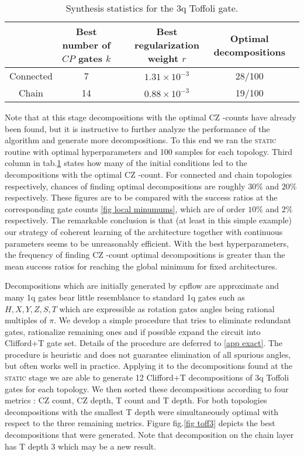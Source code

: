\documentclass[draft, amsfonts, amssymb, aps, nofootinbib, twocolumn]{revtex4-2}
\newcommand{\CZ}{CZ }
\newcommand{\CP}{CP }
\newcommand{\T}{T }
\newcommand{\cpflow}{\textrm {cpflow }}
\newcommand{\static}{\textsc{static }}
\begin{document}
\begin{table}[]
	\begin{tabular}{@{}cccccc@{}}
		\toprule
		& \shortstack[l]{Best number of\\ $\CP$ gates $k$} && \shortstack[l]{Best regularization\\ weight $r$} &  \shortstack[l]{Optimal \\ decompositions} &  \\ \midrule
		Connected & 7      && $1.31\times10^{-3}$ & 28/100                 &  \\
		Chain     & 14     && $0.88\times10^{-3}$ & 19/100                  &  \\ \bottomrule
	\end{tabular}
\caption {Synthesis statistics for the 3q Toffoli gate.}
\label{tab toff3}
\end{table}

Note that at this stage decompositions with the optimal \CZ-counts have already been found, but it is instructive to further analyze the performance of the algorithm and generate more decompositions. To this end we ran the \static routine with optimal hyperparameters and 100 samples for each topology. Third column in tab.\ref{tab toff3} states how many of the initial conditions led to the decompositions with the optimal \CZ-count. For connected and chain topologies respectively, chances of finding optimal decompositions are roughly $30\%$ and $20\%$ respectively. These figures are to be compared with the success ratios at the corresponding gate counts \ref{fig local minumums}, which are of order $10\%$ and $2\%$ respectively. The remarkable conclusion is that (at least in this simple example) our strategy of coherent learning of the architecture together with continuous parameters seems to be unreasonably efficient. With the best hyperparameters, the frequency of finding \CZ-count optimal decompositions is greater than the mean success ratios for reaching the global minimum for fixed architectures.

Decompositions which are initially generated by \cpflow are approximate and many 1q gates bear little resemblance to standard 1q gates such as $H, X, Y, Z, S, T$  which are expressible as rotation gates angles being rational multiples of $\pi$. We develop a simple procedure that tries to eliminate redundant gates, rationalize remaining ones and if possible expand the circuit into Clifford+T gate set. Details of the procedure are deferred to \ref{app exact}. The procedure is heuristic and does not guarantee elimination of all spurious angles, but often works well in practice. Applying it to the decompositions found at the \static stage we are able to generate 12 Clifford+T decompositions of 3q Toffoli gates for each topology. We then sorted these decompositions according to four metrics : \CZ count, \CZ depth, \T count and \T depth. For both topologies decompositions with the smallest \T  depth were simultaneously optimal with respect to the three remaining metrics. Figure fig.\ref{fig toff3} depicts  the best decompositions that were generated. Note that decomposition on the chain layer has \T depth 3 which may be a new result.
\end{document}
